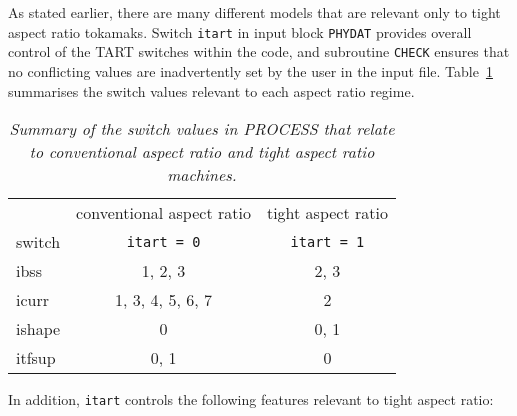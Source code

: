 As stated earlier, there are many different models that are relevant only to
tight aspect ratio tokamaks. Switch \texttt{itart} in input block
\texttt{PHYDAT} provides overall control of the TART switches within the code,
and subroutine \texttt{CHECK} ensures that no conflicting values are
inadvertently set by the user in the input file. Table~\ref{tab:tart}
summarises the switch values relevant to each aspect ratio regime.
\begin{table}
\begin{center}
\begin{tabular}{||l|c|c||} \hline
 & conventional aspect ratio & tight aspect ratio \\
switch & \texttt{itart = 0} & \texttt{itart = 1} \\ \hline
ibss & 1, 2, 3 & 2, 3 \\
icurr & 1, 3, 4, 5, 6, 7 & 2 \\
ishape & 0 & 0, 1 \\
itfsup & 0, 1 & 0 \\ \hline
\end{tabular}
\end{center}
\caption{\textit{Summary of the switch values in PROCESS that relate to
conventional aspect ratio and tight aspect ratio machines.}}
\label{tab:tart}
\end{table}
In addition, \texttt{itart} controls the following features relevant to tight
aspect ratio:

